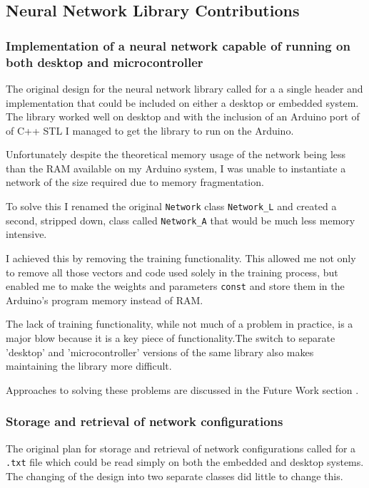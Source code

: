\documentclass[a4paper]{article}
\begin{document}
\subsection{Neural Network Library Contributions}%

\subsubsection{Implementation of a neural network capable of running on  both desktop and microcontroller}

The original design for the neural network library called for a a single header and implementation that could be included on either a desktop or embedded system. The library worked well on desktop and with the inclusion of an Arduino port of of C++ STL\cite{evref1} I managed to get the library to run on the Arduino. 

Unfortunately despite the theoretical memory usage of the network being less than the RAM available on my Arduino system, I was unable to instantiate a network of the size required due to memory fragmentation. 

To solve this I renamed the original \lstinline{Network} class \lstinline{Network_L} and created a second, stripped down, class called \lstinline{Network_A} that would be much less memory intensive.

I achieved this by removing the training functionality. This allowed me not only to remove all those vectors and code used solely in the training process, but enabled me to make the weights and parameters \lstinline{const} and store them in the Arduino's program memory instead of RAM. 

The lack of training functionality, while not much of a problem in practice, is a major blow because it is a key piece of functionality.The switch to separate 'desktop' and 'microcontroller' versions of the same library also makes maintaining the library more difficult.

Approaches to solving these problems are discussed in the Future Work section .

\subsubsection{Storage and retrieval of network configurations}

The original plan for storage and retrieval of network configurations called for a \lstinline{.txt} file which could be read simply on both the embedded and desktop systems. The changing of the design into two separate classes did little to change this.
\end{document}
